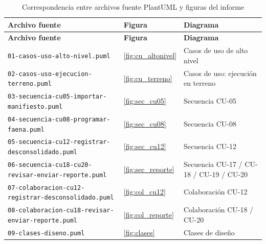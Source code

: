 {\estilotabla
\begin{longtable}{L{0.44\textwidth} C{0.10\textwidth} L{0.40\textwidth}}

\caption{Correspondencia entre archivos fuente PlantUML y figuras del informe}
\label{tab:fuentes_diagramas}
\\

\toprule
\textbf{Archivo fuente} & \textbf{Figura} & \textbf{Diagrama} \\
\midrule
\endfirsthead

\toprule
\textbf{Archivo fuente} & \textbf{Figura} & \textbf{Diagrama} \\
\midrule
\endhead

\texttt{01-casos-uso-alto-nivel.puml} & \ref{fig:cu_altonivel} &
Casos de uso de alto nivel \\
\midrule
\texttt{02-casos-uso-ejecucion-terreno.puml} & \ref{fig:cu_terreno} &
Casos de uso: ejecución en terreno \\
\midrule
\texttt{03-secuencia-cu05-importar-manifiesto.puml} & \ref{fig:sec_cu05} &
Secuencia CU-05 \\
\midrule
\texttt{04-secuencia-cu08-programar-faena.puml} & \ref{fig:sec_cu08} &
Secuencia CU-08 \\
\midrule
\texttt{05-secuencia-cu12-registrar-desconsolidado.puml} & \ref{fig:sec_cu12} &
Secuencia CU-12 \\
\midrule
\texttt{06-secuencia-cu18-cu20-revisar-enviar-reporte.puml} & \ref{fig:sec_reporte} &
Secuencia CU-17 / CU-18 / CU-19 / CU-20 \\
\midrule
\texttt{07-colaboracion-cu12-registrar-desconsolidado.puml} & \ref{fig:col_cu12} &
Colaboración CU-12 \\
\midrule
\texttt{08-colaboracion-cu18-revisar-enviar-reporte.puml} & \ref{fig:col_reporte} &
Colaboración CU-18 / CU-20 \\
\midrule
\texttt{09-clases-diseno.puml} & \ref{fig:clases} &
Clases de diseño \\

\bottomrule

\end{longtable}
}

